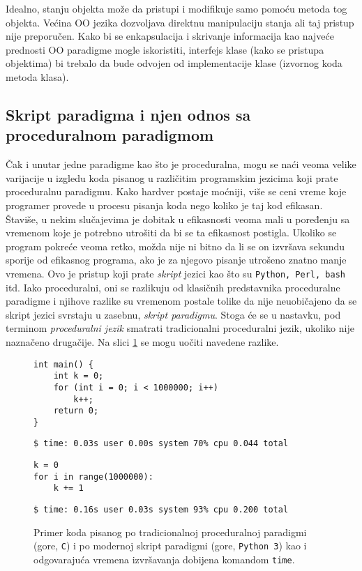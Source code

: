 Idealno, stanju objekta može da pristupi i modifikuje samo pomoću metoda tog objekta. Većina OO jezika dozvoljava direktnu manipulaciju stanja ali taj pristup nije preporučen. Kako bi se enkapsulacija i skrivanje informacija kao najveće prednosti OO paradigme mogle iskoristiti, interfejs klase (kako se pristupa objektima) bi trebalo da bude odvojen od implementacije klase (izvornog koda metoda klasa).


\subsection{Skript paradigma i njen odnos sa proceduralnom paradigmom}
\label{subsec:Languages}

Čak i unutar jedne paradigme kao što je proceduralna, mogu se naći veoma velike varijacije u izgledu koda pisanog u različitim programskim jezicima koji prate proceduralnu paradigmu. Kako hardver postaje moćniji, više se ceni vreme koje programer provede u procesu pisanja koda nego koliko je taj kod efikasan. Štaviše, u nekim slučajevima je dobitak u efikasnosti veoma mali u poređenju sa vremenom koje je potrebno utrošiti da bi se ta efikasnost postigla. Ukoliko se program pokreće veoma retko, možda nije ni bitno da li se on izvršava sekundu sporije od efikasnog programa, ako je za njegovo pisanje utrošeno znatno manje vremena. Ovo je pristup koji prate \emph{skript} jezici kao što su \texttt{Python, Perl, bash} itd. Iako proceduralni, oni se razlikuju od klasičnih predstavnika proceduralne paradigme i njihove razlike su vremenom postale tolike da nije neuobičajeno da se skript jezici svrstaju u zasebnu, \emph{skript paradigmu}. Stoga će se u nastavku, pod terminom \emph{proceduralni jezik} smatrati tradicionalni proceduralni jezik, ukoliko nije naznačeno drugačije. Na slici \ref{fig:LanguagesDiff} se mogu uočiti navedene razlike.

\begin{figure}[h!]
\begin{lstlisting}
int main() {
    int k = 0;
    for (int i = 0; i < 1000000; i++)
        k++;
    return 0;
}
\end{lstlisting}
\begin{lstlisting}[language={}]
$ time: 0.03s user 0.00s system 70% cpu 0.044 total
\end{lstlisting}
\begin{lstlisting}
k = 0
for i in range(1000000):
    k += 1
\end{lstlisting}
\begin{lstlisting}[language={}]
$ time: 0.16s user 0.03s system 93% cpu 0.200 total
\end{lstlisting}
\caption{Primer koda pisanog po tradicionalnoj proceduralnoj paradigmi (gore, \texttt{C}) i po modernoj skript paradigmi (gore, \texttt{Python 3}) kao i odgovarajuća vremena izvršavanja dobijena komandom \texttt{time}.}
\label{fig:LanguagesDiff}
\end{figure}

